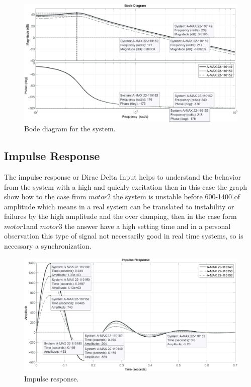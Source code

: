 \documentclass[12pt]{article}
\begin{document}
\begin{figure}[H]
	\centering		
	\includegraphics[scale=0.3]{bode.eps}
	\captionsetup{justification=centering}
	
	\caption{Bode diagram for the system.}
	\label{f2}
\end{figure}

\subsection{Impulse Response}
The impulse response or Dirac Delta Input helps to understand the behavior from the system with a high and quickly excitation then in this case the graph show how to the case from $motor2$ the system is unstable before 600-1400 of amplitude which means in a real system can be translated to instability or failures by the high amplitude and the over damping, then in the case form $motor1$and $motor3$ the answer have a high setting time and in a personal observation this type of signal not necessarily good in real time systems, so is necessary a synchronization.

\begin{figure}[H]
	\centering		
	\includegraphics[scale=0.3]{impulse.eps}
	\captionsetup{justification=centering}
	\caption{Impulse response.}
	\label{f3}
\end{figure}
\end{document}
